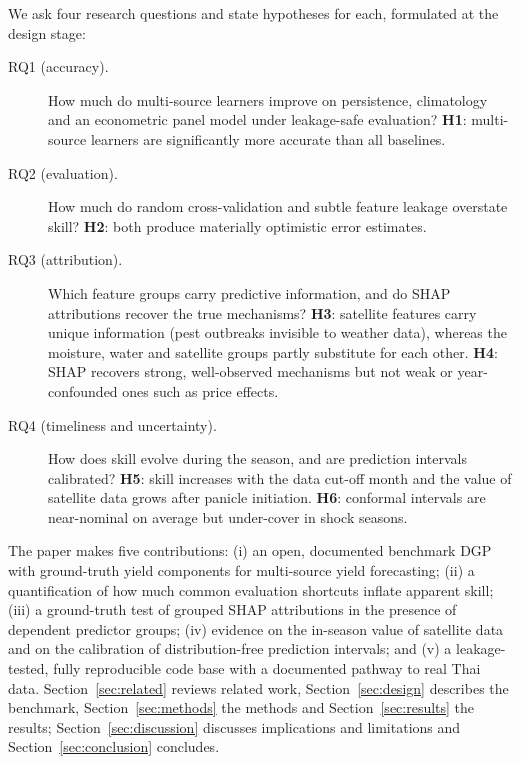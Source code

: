 We ask four research questions and state hypotheses for each, formulated at the design stage:
\begin{description}
\item[RQ1 (accuracy).] How much do multi-source learners improve on persistence, climatology and an econometric panel model under leakage-safe evaluation? \textbf{H1}: multi-source learners are significantly more accurate than all baselines.
\item[RQ2 (evaluation).] How much do random cross-validation and subtle feature leakage overstate skill? \textbf{H2}: both produce materially optimistic error estimates.
\item[RQ3 (attribution).] Which feature groups carry predictive information, and do SHAP attributions recover the true mechanisms? \textbf{H3}: satellite features carry unique information (pest outbreaks invisible to weather data), whereas the moisture, water and satellite groups partly substitute for each other. \textbf{H4}: SHAP recovers strong, well-observed mechanisms but not weak or year-confounded ones such as price effects.
\item[RQ4 (timeliness and uncertainty).] How does skill evolve during the season, and are prediction intervals calibrated? \textbf{H5}: skill increases with the data cut-off month and the value of satellite data grows after panicle initiation. \textbf{H6}: conformal intervals are near-nominal on average but under-cover in shock seasons.
\end{description}

The paper makes five contributions: (i) an open, documented benchmark DGP with ground-truth yield components for multi-source yield forecasting; (ii) a quantification of how much common evaluation shortcuts inflate apparent skill; (iii) a ground-truth test of grouped SHAP attributions in the presence of dependent predictor groups; (iv) evidence on the in-season value of satellite data and on the calibration of distribution-free prediction intervals; and (v) a leakage-tested, fully reproducible code base with a documented pathway to real Thai data. Section~\ref{sec:related} reviews related work, Section~\ref{sec:design} describes the benchmark, Section~\ref{sec:methods} the methods and Section~\ref{sec:results} the results; Section~\ref{sec:discussion} discusses implications and limitations and Section~\ref{sec:conclusion} concludes.
